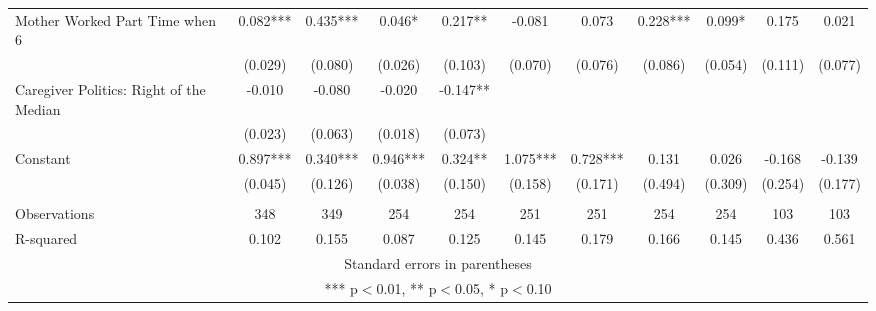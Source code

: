 \begin{tabular}{lcccccccccc}
Mother Worked Part Time when 6 & 0.082*** & 0.435*** & 0.046* & 0.217** & -0.081 & 0.073 & 0.228*** & 0.099* & 0.175 & 0.021 \\
 & (0.029) & (0.080) & (0.026) & (0.103) & (0.070) & (0.076) & (0.086) & (0.054) & (0.111) & (0.077) \\
Caregiver Politics: Right of the Median & -0.010 & -0.080 & -0.020 & -0.147** &  &  &  &  &  &  \\
 & (0.023) & (0.063) & (0.018) & (0.073) &  &  &  &  &  &  \\
Constant & 0.897*** & 0.340*** & 0.946*** & 0.324** & 1.075*** & 0.728*** & 0.131 & 0.026 & -0.168 & -0.139 \\
 & (0.045) & (0.126) & (0.038) & (0.150) & (0.158) & (0.171) & (0.494) & (0.309) & (0.254) & (0.177) \\
 &  &  &  &  &  &  &  &  &  &  \\
Observations & 348 & 349 & 254 & 254 & 251 & 251 & 254 & 254 & 103 & 103 \\
 R-squared & 0.102 & 0.155 & 0.087 & 0.125 & 0.145 & 0.179 & 0.166 & 0.145 & 0.436 & 0.561 \\ \hline
\multicolumn{11}{c}{ Standard errors in parentheses} \\
\multicolumn{11}{c}{ *** p$<$0.01, ** p$<$0.05, * p$<$0.10} \\
\end{tabular}
